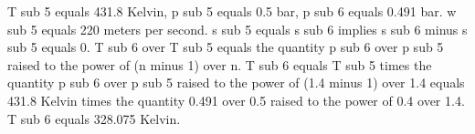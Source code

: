 T sub 5 equals 431.8 Kelvin, p sub 5 equals 0.5 bar, p sub 6 equals 0.491 bar. w sub 5 equals 220 meters per second. s sub 5 equals s sub 6 implies s sub 6 minus s sub 5 equals 0. T sub 6 over T sub 5 equals the quantity p sub 6 over p sub 5 raised to the power of (n minus 1) over n. T sub 6 equals T sub 5 times the quantity p sub 6 over p sub 5 raised to the power of (1.4 minus 1) over 1.4 equals 431.8 Kelvin times the quantity 0.491 over 0.5 raised to the power of 0.4 over 1.4. T sub 6 equals 328.075 Kelvin.
